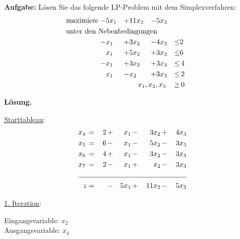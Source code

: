 \documentclass[10pt,a4paper,oneside,ngerman,numbers=noenddot]{scrartcl}
\begin{document}
	\subsection{} %
		\textbf{Aufgabe:} Lösen Sie das folgende LP-Problem mit dem Simplexverfahren:
		\begin{alignat*}{4}
			\text{maximiere}\; -& 5x_{1} &+& 11x_{2} &-& 5x_{3} && \\
			\multicolumn{8}{l}{\text{unter den Nebenbedingungen}} && \\
			\;-& x_{1} &+& 3x_{2} &-& 4x_{3} &\leq & 2 \\
			\;& x_{1} &+& 5x_{2} &+& 3x_{3} &\leq & 6 \\
			\;-& x_{1} &+& 3x_{2} &+& 3x_{3} &\leq &\, 4 \\
			\;& x_{1} &-& x_{2} &+& 3x_{3} &\leq &\, 2 \\			
			\multicolumn{6}{r}{$x_{1}, x_{2}, x_{3}$} \,&\geq &\, 0
		\end{alignat*}
		
		\textbf{Lösung.}
		
		\underline{Starttableau}:
		\begin{alignat*}{5}
			x_{4} \,&=&\, 2 \,&+&\, x_{1} \,&-&\, 3x_{2} \,&+&\, 4x_{3} \\
			x_{5} \,&=&\, 6 \,&-&\, x_{1} \,&-&\, 5x_{2} \,&-&\, 3x_{3} \\
			x_{6} \,&=&\, 4 \,&+&\, x_{1} \,&-&\, 3x_{2} \,&-&\, 3x_{3} \\
			x_{7} \,&=&\, 2 \,&-&\, x_{1} \,&+&\, x_{2} \,&-&\, 3x_{3} \\ \cline{1 - 9}
			z &=& &-& 5x_{1} \,&+&\, 11x_{2} \,&-&\, 5x_{3}
		\end{alignat*}
		
		\underline{1. Iteration}:
		
		Eingangsvariable: $x_{2}$\\
		Ausgangsvariable: $x_{4}$
		
\end{document}
